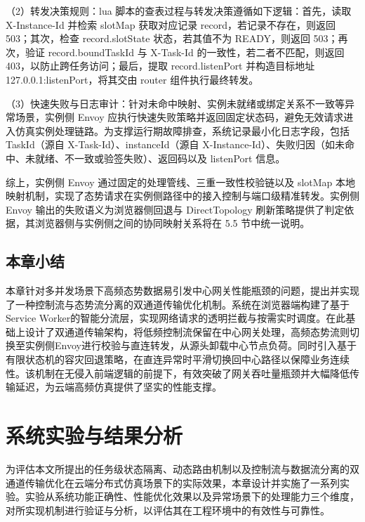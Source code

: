 \documentclass[lang=chs, degree=master, blindreview=true, winfonts=true, academic=false]{yanputhesis}
\begin{document}
（2）转发决策规则：lua 脚本的查表过程与转发决策遵循如下逻辑：首先，读取 X-Instance-Id 并检索 slotMap 获取对应记录 record，若记录不存在，则返回 503；其次，检查 record.slotState 状态，若其值不为 READY，则返回 503；再次，验证 record.boundTaskId 与 X-Task-Id 的一致性，若二者不匹配，则返回 403，以防止跨任务访问；最后，提取 record.listenPort 并构造目标地址 127.0.0.1:listenPort，将其交由 router 组件执行最终转发。

（3）快速失败与日志审计：针对未命中映射、实例未就绪或绑定关系不一致等异常场景，实例侧 Envoy 应执行快速失败策略并返回固定状态码，避免无效请求进入仿真实例处理链路。为支撑运行期故障排查，系统记录最小化日志字段，包括 TaskId（源自 X-Task-Id）、instanceId（源自 X-Instance-Id）、失败归因（如未命中、未就绪、不一致或验签失败）、返回码以及 listenPort 信息。

综上，实例侧 Envoy 通过固定的处理管线、三重一致性校验链以及 slotMap 本地映射机制，实现了态势请求在实例侧路径中的接入控制与端口级精准转发。实例侧 Envoy 输出的失败语义为浏览器侧回退与 DirectTopology 刷新策略提供了判定依据，其浏览器侧与实例侧之间的协同映射关系将在 5.5 节中统一说明。
\section{本章小结}

本章针对多并发场景下高频态势数据易引发中心网关性能瓶颈的问题，提出并实现了一种控制流与态势流分离的双通道传输优化机制。系统在浏览器端构建了基于Service Worker的智能分流层，实现网络请求的透明拦截与按需实时调度。在此基础上设计了双通道传输架构，将低频控制流保留在中心网关处理，高频态势流则切换至实例侧Envoy进行校验与直连转发，从源头卸载中心节点负荷。同时引入基于有限状态机的容灾回退策略，在直连异常时平滑切换回中心路径以保障业务连续性。该机制在无侵入前端逻辑的前提下，有效突破了网关吞吐量瓶颈并大幅降低传输延迟，为云端高频仿真提供了坚实的性能支撑。








\cleardoublepage


\chapter{系统实验与结果分析}

为评估本文所提出的任务级状态隔离、动态路由机制以及控制流与数据流分离的双通道传输优化在云端分布式仿真场景下的实际效果，本章设计并实施了一系列实验。实验从系统功能正确性、性能优化效果以及异常场景下的处理能力三个维度，对所实现机制进行验证与分析，以评估其在工程环境中的有效性与可靠性。
\end{document}
